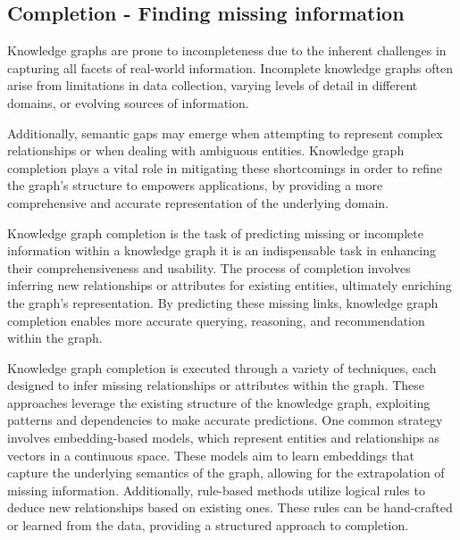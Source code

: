 
\subsection{Completion - Finding missing information}

Knowledge graphs are prone to incompleteness due to the inherent challenges in capturing all facets of real-world information. Incomplete knowledge graphs often arise from limitations in data collection, varying levels of detail in different domains, or evolving sources of information. 

Additionally, semantic gaps may emerge when attempting to represent complex relationships or when dealing with ambiguous entities. Knowledge graph completion plays a vital role in mitigating these shortcomings in order to refine the graph's structure to empowers applications, by providing a more comprehensive and accurate representation of the underlying domain.

Knowledge graph completion is the task of predicting missing or incomplete information within a knowledge graph it is an indispensable task in enhancing their comprehensiveness and usability. The process of completion involves inferring new relationships or attributes for existing entities, ultimately enriching the graph's representation. By predicting these missing links, knowledge graph completion enables more accurate querying, reasoning, and recommendation within the graph. 

Knowledge graph completion is executed through a variety of techniques, each designed to infer missing relationships or attributes within the graph. These approaches leverage the existing structure of the knowledge graph, exploiting patterns and dependencies to make accurate predictions. One common strategy involves embedding-based models, which represent entities and relationships as vectors in a continuous space. These models aim to learn embeddings that capture the underlying semantics of the graph, allowing for the extrapolation of missing information. Additionally, rule-based methods utilize logical rules to deduce new relationships based on existing ones. These rules can be hand-crafted or learned from the data, providing a structured approach to completion.

